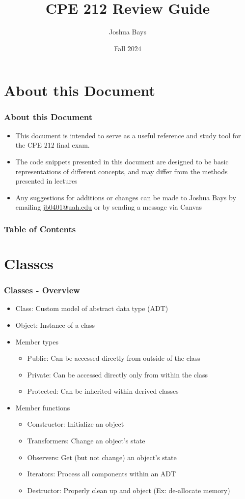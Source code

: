 \documentclass[c, aspectratio=169]{beamer}
\title{CPE 212 Review Guide}
\author{Joshua Bays}\date{Fall 2024}
\institute{Univeristy of Alabama in Huntsville}
\begin{document}
\begin{frame}
\titlepage
\end{frame}

\section*{About this Document}
\begin{frame}\frametitle{About this Document}
\begin{itemize}
\item This document is intended to serve as a useful reference and study tool for the CPE 212 final exam.
\item The code snippets presented in this document are designed to be basic representations of different concepts, and may differ from the methods presented in lectures
\item Any suggestions for additions or changes can be made to Joshua Bays by emailing \href{mailto:jb0401@uah.edu}{jb0401@uah.edu} or by sending a message via Canvas
\end{itemize}
\end{frame}

\begin{frame}\frametitle{Table of Contents}
\begin{multicols}{2}
\tableofcontents
\end{multicols}
\end{frame}

\section{Classes}
\begin{frame}\frametitle{Classes - Overview}
\begin{itemize}
\item Class: Custom model of abstract data type (ADT)
\item Object: Instance of a class
\item Member types
	\begin{itemize}
	\item Public: Can be accessed directly from outside of the class
	\item Private: Can be accessed directly only from within the class
	\item Protected: Can be inherited within derived classes
	\end{itemize}
\item Member functions
	\begin{itemize}
	\item Constructor: Initialize an object
	\item Transformers: Change an object's state
	\item Observers: Get (but not change) an object's state
	\item Iterators: Process all components within an ADT
	\item Destructor: Properly clean up and object (Ex: de-allocate memory)
	\end{itemize}
\end{itemize}
\end{frame}
\end{document}
